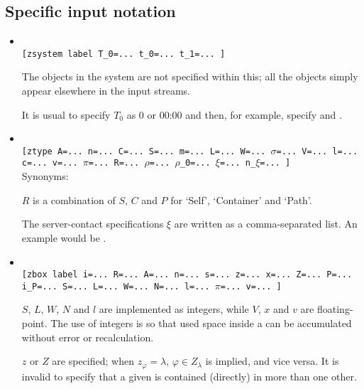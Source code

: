 \subsection{Specific input notation}

\begin{itemize} 

%
\item {} \\
{\tt [zsystem label T\_0=... t\_0=... t\_1=... ]}

The objects in the system are not specified within this; all the objects simply appear elsewhere
in the input streams.

It is usual to specify $T_0$ as $0$ or 00:00 and then, for example,
specify  and .


\item {} \\
{\tt [ztype A=... n=... C=... S=... m=... L=... W=... $\sigma$=... V=... l=... 
  c=... v=... $\pi$=... R=... $\rho$=... $\rho$\_0=... $\xi$=... n\_$\xi$=... ]} \\ 
Synonyms: \inp{[ sigma=... pi=... rho=... rho\_0=... xi=... n\_xi=... ]}

$R$ is a combination of $S$, $C$ and $P$ for `Self', `Container' and `Path'.

The server-contact specifications $\xi$ are written as a comma-separated list.
  An example would be .

\item {} \\
{\tt [zbox label i=... R=... A=... n=...  s=... z=... x=... Z=... P=... i\_P=...
 S=... L=... W=... N=... l=... $\pi$=...  v=... ] }

  $S$, $L$, $W$, $N$ and $l$ are implemented as integers, while $V$,
  $x$ and $v$ are floating-point.  The use of integers is so that used
  space inside a  can be accumulated without error or
  recalculation.

  $z$ or $Z$ are specified; when $z_\varphi = \lambda$,
  $\varphi \in Z_\lambda$ is implied, and vice versa. It is invalid to specify that a
  given  is contained (directly) in more than one other.


\end{itemize}
